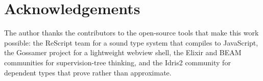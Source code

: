 \documentclass[11pt,a4paper]{article}
\begin{document}
\section*{Acknowledgements}

The author thanks the contributors to the open-source tools that
make this work possible: the ReScript team for a sound type system
that compiles to JavaScript, the Gossamer project for a lightweight webview shell, the Elixir and BEAM communities for
supervision-tree thinking, and the Idris2 community for dependent
types that prove rather than approximate.

\end{document}
